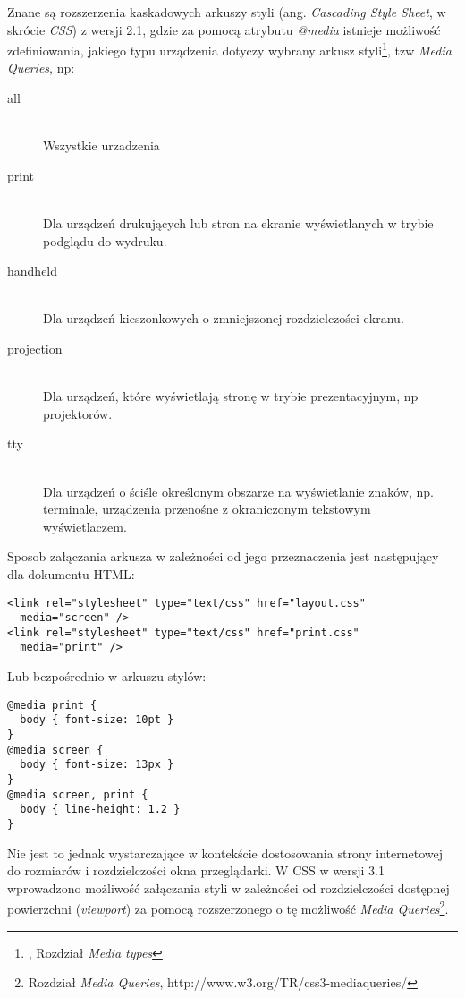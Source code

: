 Znane są rozszerzenia kaskadowych arkuszy styli (ang. \emph{Cascading Style Sheet}, w skrócie \emph{CSS}) z wersji 2.1\cite{css21}, gdzie za pomocą atrybutu \emph{@media} istnieje możliwość zdefiniowania, jakiego typu urządzenia dotyczy wybrany arkusz styli\footnote{\cite{css21}, Rozdział \emph{Media types}}, tzw \emph{Media Queries}, np:

\begin{description}
  \item[all] \hfill \\
  Wszystkie urzadzenia
  \item[print] \hfill \\
  Dla urządzeń drukujących lub stron na ekranie wyświetlanych w trybie podglądu do wydruku.
  \item[handheld] \hfill \\
  Dla urządzeń kieszonkowych o zmniejszonej rozdzielczości ekranu.
  \item[projection] \hfill \\
  Dla urządzeń, które wyświetlają stronę w trybie prezentacyjnym, np projektorów.
  \item[tty] \hfill \\
  Dla urządzeń o ściśle określonym obszarze na wyświetlanie znaków, np. terminale, urządzenia przenośne z okraniczonym tekstowym wyświetlaczem.
\end{description}

Sposob załączania arkusza w zależności od jego przeznaczenia jest następujący dla dokumentu HTML:

\lstset{language=HTML}
\begin{lstlisting}
<link rel="stylesheet" type="text/css" href="layout.css"
  media="screen" />
<link rel="stylesheet" type="text/css" href="print.css"
  media="print" />
\end{lstlisting}

Lub bezpośrednio w arkuszu stylów:

\lstset{language=Octave}
\begin{lstlisting}
@media print {
  body { font-size: 10pt }
}
@media screen {
  body { font-size: 13px }
}
@media screen, print {
  body { line-height: 1.2 }
}
\end{lstlisting}

Nie jest to jednak wystarczające w kontekście dostosowania strony internetowej do rozmiarów i rozdzielczości okna przeglądarki. W CSS w wersji 3.1 wprowadzono możliwość załączania styli w zależności od rozdzielczości dostępnej powierzchni (\emph{viewport}) za pomocą rozszerzonego o tę możliwość \emph{Media Queries}\cite{css3}\footnote{\cite{css3} Rozdział \emph{Media Queries}, http://www.w3.org/TR/css3-mediaqueries/}.

